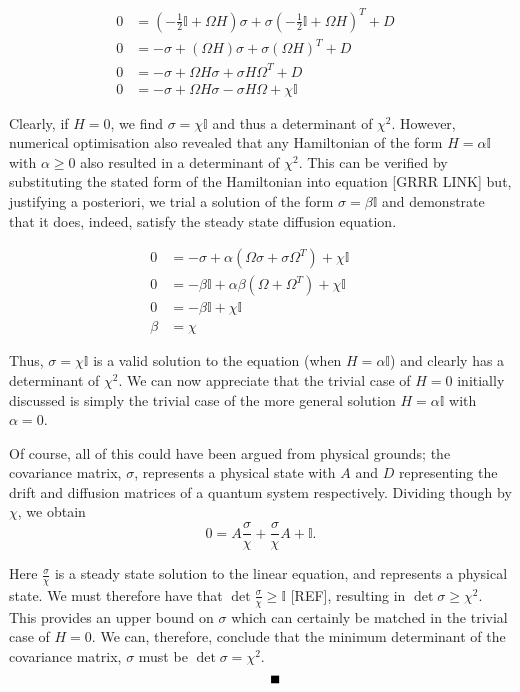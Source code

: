 \documentclass[11pt,a4paper]{article}
\numberwithin{equation}{section}
\begin{document}
	\begin{align}	
	0 &= (-\frac{1}{2}\mathbb{I} + \Omega H)\sigma +\sigma (-\frac{1}{2}\mathbb{I} + \Omega H)^{T} + D&\nonumber\\
	0 &= -\sigma + (\Omega H)\sigma +\sigma (\Omega H)^{T} + D& \nonumber\\
	0 &= -\sigma + \Omega H\sigma +\sigma H\Omega^{T} + D \nonumber&\\
	0 &= -\sigma + \Omega H\sigma -\sigma H\Omega + \chi \mathbb{I} &
	\end{align}
	
	Clearly, if $H=0$, we find $\sigma = \chi \mathbb{I}$ and thus a determinant of $\chi^2$. However, numerical optimisation also revealed that any Hamiltonian of the form $H=\alpha\mathbb{I}$ with $\alpha \geq0$ also resulted in a determinant of  $\chi^2$. This can be verified by substituting the stated form of the Hamiltonian into equation [GRRR LINK] but, justifying a posteriori, we trial a solution of the form $\sigma=\beta\mathbb{I}$ and demonstrate that it does, indeed, satisfy the steady state diffusion equation. 
	
	\begin{align*}
	0 &= -\sigma + \alpha (\Omega \sigma + \sigma \Omega^{T}) + \chi \mathbb{I}&\\
	0 &= -\beta \mathbb{I} + \alpha \beta (\Omega + \Omega^T) + \chi \mathbb{I}&\\
	0 & = -\beta \mathbb{I} + \chi \mathbb{I} & \tag*{as $\Omega$ is anti-symmetric}&\\
	\beta &= \chi&
	\end{align*}
	
	Thus, $\sigma=\chi\mathbb{I}$ is a valid solution to the equation (when $H=\alpha\mathbb{I}$) and clearly has a determinant of $\chi^2$. We can now appreciate that the trivial case of $H=0$ initially discussed is simply the trivial case of the more general solution $H=\alpha\mathbb{I}$ with $\alpha=0$.
	
	Of course, all of this could have been argued from physical grounds; the covariance matrix, $\sigma$, represents a physical state with $A$ and $D$ representing the drift and diffusion matrices of a quantum system respectively. Dividing though by $\chi$, we obtain
	\begin{equation*}
	0 = A \frac{\sigma}{\chi} + \frac{\sigma}{\chi} A + \mathbb{I}.
	\end{equation*}
	
	Here $\frac{\sigma}{\chi}$ is a steady state solution to the linear equation, and represents a physical state. We must therefore have that $\det\frac{\sigma}{\chi} \geq \mathbb{I}$ [REF], resulting in $\det \sigma \geq \chi^2$. This provides an upper bound on $\sigma$ which can certainly be matched in the trivial case of $H=0$. We can, therefore, conclude that the minimum determinant of the covariance matrix, $\sigma$ must be $\det \sigma = \chi^2$.
	\begin{equation*}
	\tag*{\rule{2mm}{2mm}}
	\end{equation*}
	
\end{document}
